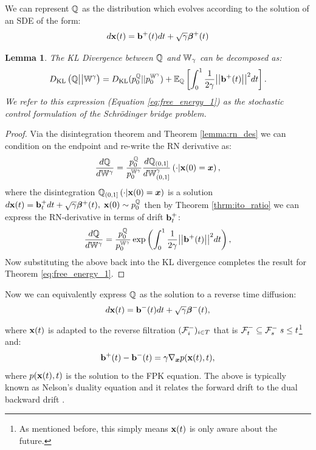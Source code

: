 \documentclass[a4paper,12pt,twoside,openright]{report}
\newtheorem{lemma}{Lemma}
\theoremstyle{definition}
\begin{document}
We can represent ${\mathbb{Q}}$ as the distribution which evolves according to the solution of an SDE of the form:
\begin{align*}
    d{\mathbf{x}}(t) = {\mathbf{b}}^{+}(t) dt + \sqrt{\gamma} {\bm{\beta}}^+(t)
\end{align*}
\begin{lemma}\citep{pavon1991free}
    The KL Divergence between ${\mathbb{Q}}$ and $\mathbb{W}_{\gamma}$ can be decomposed as:
\begin{align}\label{eq:free_energy_1}
     D_{\mathrm{KL}}\left({\mathbb{Q}} \big|\big| \mathbb{W}^{\gamma}\right) = D_{\mathrm{KL}}(p^{{\mathbb{Q}}}_0 || p_0^{ \mathbb{W}^{\gamma}}) + \mathbb{E}_{\mathbb{Q}}\left[\int_0^1 \frac{1}{2\gamma}\big|\big|{\mathbf{b}}^{+}(t) \big|\big|^2 dt\right].
\end{align}
We refer to this expression (Equation \ref{eq:free_energy_1}) as the stochastic control formulation of the Schrödinger bridge problem.
\end{lemma}
\begin{proof}
Via the disintegration theorem and Theorem \ref{lemma:rn_des} we can condition on the endpoint and re-write the RN derivative as:
\begin{align*}
    \frac{d{\mathbb{Q}}}{d\mathbb{W}^{ \gamma}} = \frac{p_0^{\mathbb{Q}}}{p_0^{ \mathbb{W}^{\gamma}}} \frac{d{\mathbb{Q}}_{(0,1]}}{d\mathbb{W}_{(0,1]}^{\gamma}}\left(\cdot | {\mathbf{x}}(0) ={\bm{x}}\right),
\end{align*}
where the disintegration ${\mathbb{Q}}_{(0,1]}\left(\cdot | {\mathbf{x}}(0) = {\bm{x}} \right)$ is a solution $d{\mathbf{x}}(t) = {\mathbf{b}}_t^+ dt + \sqrt{\gamma} {\bm{\beta}}^+(t), \; {\mathbf{x}}(0) \sim p_0^{\mathbb{Q}}$ then by Theorem \ref{thrm:ito_ratio} we can express the RN-derivative in terms of  drift ${\mathbf{b}}_t^+$:
\begin{align*}
    \frac{d{\mathbb{Q}}}{d\mathbb{W}^{\gamma}} = \frac{p_0^{\mathbb{Q}}}{p_0^{ \mathbb{W}^{\gamma}}}\exp\left(\int_0^1\frac{1}{2\gamma} \big|\big|{\mathbf{b}}^+(t)\big|\big|^2 dt\right),
\end{align*}
Now substituting the above back into the KL divergence completes the result for Theorem \ref{eq:free_energy_1}.
\end{proof}
Now we can equivalently express ${\mathbb{Q}}$ as the solution to a reverse time diffusion:
\begin{align}
    d{\mathbf{x}}(t) = {\mathbf{b}}^{-}(t) dt + \sqrt{\gamma} {\bm{\beta}}^{-}(t), 
\end{align}
where ${\mathbf{x}}(t)$ is adapted to the reverse filtration $({\mathcal{F}}^{-}_i)_{i\in T}$ that is ${\mathcal{F}}^{-}_t \subseteq {\mathcal{F}}^{-}_s \; s \leq t$\footnote{As mentioned before, this simply means ${\mathbf{x}}(t)$  is only aware about the future.} and:
\begin{align}\label{eq:nelson}
    {{\mathbf{b}}^{+}(t) - {\mathbf{b}}^{-}(t)} =\gamma \nabla_{{\bm{x}}} p({\mathbf{x}}(t), t),
\end{align}
where $p({\mathbf{x}}(t), t)$ is the solution to the FPK equation. The above is typically known as Nelson's duality equation and it relates the forward drift to the dual backward drift \citep{nelson1967dynamical}. 
\end{document}
